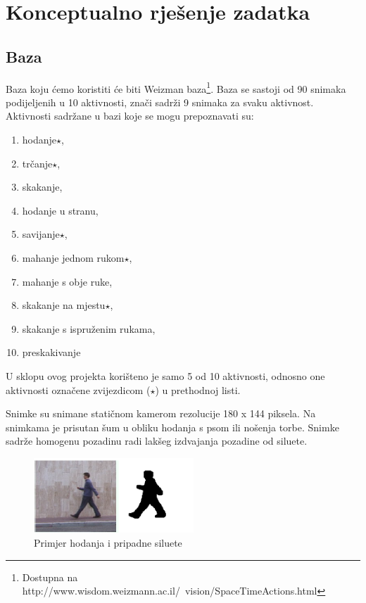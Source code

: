 \documentclass[times, utf8, diplomski]{fer}
\begin{document}
\section{Konceptualno rješenje zadatka}

\subsection{Baza}

Baza koju ćemo koristiti će biti Weizman baza\footnote{Dostupna na http://www.wisdom.weizmann.ac.il/~vision/SpaceTimeActions.html}. Baza se sastoji od 90 snimaka podijeljenih u
10 aktivnosti, znači sadrži 9 snimaka za svaku aktivnost. Aktivnosti sadržane u bazi koje se
mogu prepoznavati su:

\begin{enumerate}
\item hodanje$\star$,
\item trčanje$\star$,
\item skakanje,
\item hodanje u stranu,
\item savijanje$\star$,
\item mahanje jednom rukom$\star$,
\item mahanje s obje ruke,
\item skakanje na mjestu$\star$,
\item skakanje s ispruženim rukama,
\item preskakivanje
\end{enumerate}


U sklopu ovog projekta korišteno je samo 5 od 10 aktivnosti, odnosno one aktivnosti označene zvijezdicom ($\star$) u prethodnoj listi.

Snimke su snimane statičnom kamerom rezolucije 180 x 144 piksela. Na snimkama je
prisutan šum u obliku hodanja s psom ili nošenja torbe. Snimke sadrže homogenu pozadinu
radi lakšeg izdvajanja pozadine od siluete.
\newline
\begin{figure}[ht!]
\centering
\includegraphics[width=60mm]{walk.png}
\caption{ Primjer hodanja i pripadne siluete \label{overflow}}
\end{figure}
\end{document}
